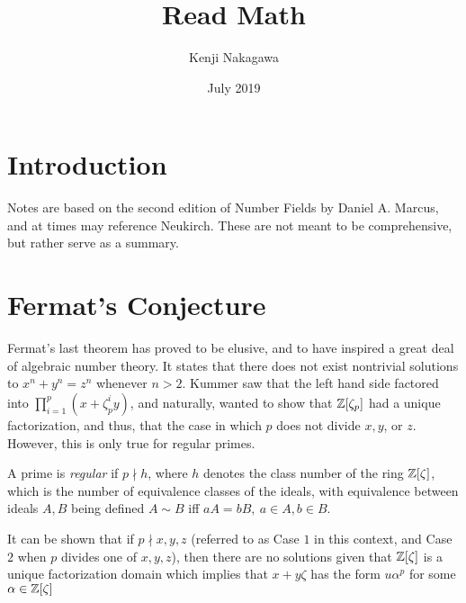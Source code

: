 \documentclass{article}
\title{Read Math}
\author{Kenji Nakagawa}
\date{July 2019}
\begin{document}
\maketitle

\section*{Introduction}
Notes are based on the second edition of Number Fields by Daniel A. Marcus, and at times may reference Neukirch. These are not meant to be comprehensive, but rather serve as a summary.


\section{Fermat's Conjecture}
Fermat's last theorem has proved to be elusive, and to have inspired a great deal of algebraic number theory. It states that there does not exist nontrivial solutions to \(x^n+y^n=z^n \) whenever \(n > 2\). Kummer saw that the left hand side factored into \(\prod\limits_{i=1}^p (x+\zeta_p^iy)\), and naturally, wanted to show that \(\mathbb Z[\zeta_p] \) had a unique factorization, and thus, that the case in which \( p\) does not divide \(x,y\), or \(z\). However, this is only true for regular primes.
\begin{definition}
A prime is \textit{regular} if \(p \nmid h \), where \(h\) denotes the class number of the ring \(\mathbb Z[\zeta]\), which is the number of equivalence classes of the ideals, with equivalence between ideals \(A,B\) being defined \(A \sim B\) iff \(aA=bB, \ a \in A, b \in B\).
\end{definition}

It can be shown that if \(p \nmid x,y,z\) (referred to as Case \(1\) in this context, and Case \(2\) when \(p\) divides one of \(x,y,z\)), then there are no solutions given that \(\mathbb Z[\zeta]\) is a unique factorization domain which implies that \(x+y\zeta \) has the form \(u\alpha^p\) for some \( \alpha \in \mathbb Z[\zeta]\)
\end{document}

